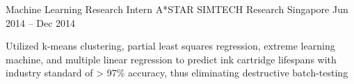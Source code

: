 \begin{cventries}
  \cventry
    {Machine Learning Research Intern} %
    {A*STAR SIMTECH Research} %
    {Singapore} %
    {Jun 2014 – Dec 2014} %
    {
      \begin{cvitems} %
        \item {Utilized k-means clustering, partial least squares regression, extreme learning machine, and multiple linear regression to predict ink cartridge lifespans with industry standard of > 97\% accuracy, thus eliminating destructive batch-testing}
      \end{cvitems}
    }

\end{cventries}

